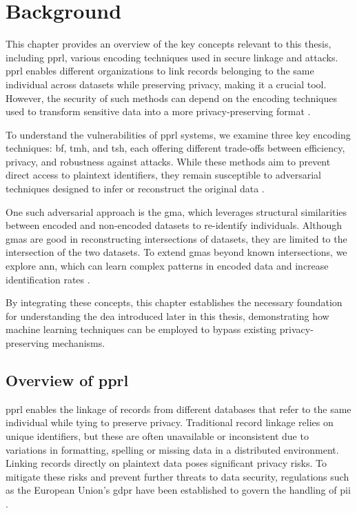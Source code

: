 \chapter{Background}  \label{sec:background}

This chapter provides an overview of the key concepts relevant to this thesis, including \ac{pprl}, various encoding techniques used in secure linkage and attacks.
\ac{pprl} enables different organizations to link records belonging to the same individual across datasets while preserving privacy, making it a crucial tool.
However, the security of such methods can depend on the encoding techniques used to transform sensitive data into a more privacy-preserving format \cite{vidanage2020graph}.

To understand the vulnerabilities of \ac{pprl} systems, we examine three key encoding techniques: \ac{bf}, \ac{tmh}, and \ac{tsh}, each offering different trade-offs between efficiency, privacy, and robustness against attacks.
While these methods aim to prevent direct access to plaintext identifiers, they remain susceptible to adversarial techniques designed to infer or reconstruct the original data \cite{vidanage2020graph,schaefer2024}.

One such adversarial approach is the \ac{gma}, which leverages structural similarities between encoded and non-encoded datasets to re-identify individuals.
Although \ac{gma}s are good in reconstructing intersections of datasets, they are limited to the intersection of the two datasets.
To extend \ac{gma}s beyond known intersections, we explore \ac{ann}, which can learn complex patterns in encoded data and increase identification rates \cite{schaefer2024,vidanage2020graph}.

By integrating these concepts, this chapter establishes the necessary foundation for understanding the \ac{dea} introduced later in this thesis, demonstrating how machine learning techniques can be employed to bypass existing privacy-preserving mechanisms.

\section{Overview of \ac{pprl} }\label{sec:pprl_overview}

\ac{pprl} enables the linkage of records from different databases that refer to the same individual while tying to preserve privacy.
Traditional record linkage relies on unique identifiers, but these are often unavailable or inconsistent due to variations in formatting, spelling or missing data in a distributed environment.
Linking records directly on plaintext data poses significant privacy risks.
To mitigate these risks and prevent further threats to data security, regulations such as the European Union's \ac{gdpr} have been established to govern the handling of \ac{pii} \cite{schaefer2024,vidanage2020graph}.

